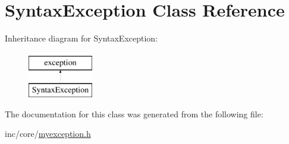 \hypertarget{classSyntaxException}{\section{Syntax\-Exception Class Reference}
\label{classSyntaxException}
}
Inheritance diagram for Syntax\-Exception\-:\begin{figure}[H]
\begin{center}
\leavevmode
\includegraphics[height=2.000000cm]{classSyntaxException}
\end{center}
\end{figure}


The documentation for this class was generated from the following file\-:\begin{DoxyCompactItemize}
\item 
inc/core/\hyperlink{myexception_8h}{myexception.\-h}\end{DoxyCompactItemize}
